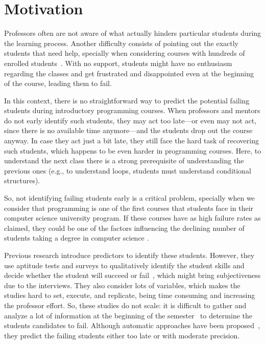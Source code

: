 \section{Motivation}

\label{sec:problem}

Professors often are not aware of what actually hinders particular students during the learning process. Another difficulty consists of pointing out the exactly students that need help, specially when considering courses with hundreds of enrolled students~\cite{bennedsen-sigcse-failure-rates-2007}. With no support, students might have no enthusiasm regarding the classes and get frustrated and disappointed even at the beginning of the course, leading them to fail.

In this context, there is no straightforward way to predict the potential failing students during introductory programming courses. When professors and mentors do not early identify such students, they may act too late---or even may not act, since there is no available time anymore---and the students drop out the course anyway. In case they act just a bit late, they still face the hard task of recovering such students, which happens to be even harder in programming courses. Here, to understand the next class there is a strong prerequisite of understanding the previous ones (e.g., to understand loops, students must understand conditional structures).

So, not identifying failing students early is a critical problem, specially when we consider that programming is one of the first courses that students face in their computer science university program. If these courses have as high failure rates as claimed, they could be one of the factors influencing the declining number of students taking a degree in computer science \cite{bennedsen-sigcse-failure-rates-2007}.

Previous research introduce predictors to identify these students. However, they use aptitude tests and surveys to qualitatively identify the student skills and decide whether the student will succeed or fail~\cite{butcher-predictor-high-school-1985, simon-predictors-ace2006, camel-2006}, which might bring subjectiveness due to the interviews. They also consider lots of variables, which makes the studies hard to set, execute, and replicate, being time consuming and increasing the professor effort. So, these studies do not scale: it is difficult to gather and analyze a lot of information at the beginning of the semester~\cite{harris-assembly-jcsc2014} to determine the students candidates to fail. Although automatic approaches have been proposed~\cite{watson-icalt-2013, emily-icer-2011}, they predict the failing students either too late or with moderate precision.

